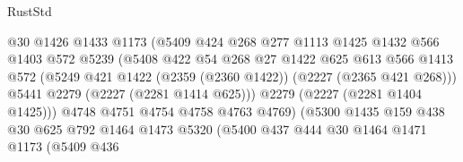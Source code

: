\begin{lexlean}{RustStd}
\begin{coremodule}
                                  @30
                                  @1426
                                  @1433
                                  @1173
                                  (@5409
                                    @424
                                    @268
                                    @277
                                    @1113
                                    @1425
                                    @1432
                                    @566
                                    @1403
                                    @572
                                    @5239
                                    (@5408
                                      @422
                                      @54
                                      @268
                                      @27
                                      @1422
                                      @625
                                      @613
                                      @566
                                      @1413
                                      @572
                                      (@5249
                                        @421
                                        @1422
                                        (@2359 (@2360 @1422))
                                        (@2227 (@2365 @421 @268)))
                                      @5441
                                      @2279
                                      (@2227 (@2281 @1414 @625)))
                                    @2279
                                    (@2227 (@2281 @1404 @1425)))
                                  @4748
                                  @4751
                                  @4754
                                  @4758
                                  @4763
                                  @4769)
                                (@5300
                                  @1435
                                  @159
                                  @438
                                  @30
                                  @625
                                  @792
                                  @1464
                                  @1473
                                  @5320
                                  (@5400
                                    @437
                                    @444
                                    @30
                                    @1464
                                    @1471
                                    @1173
                                    (@5409
                                      @436

\end{coremodule}
\end{lexlean}
